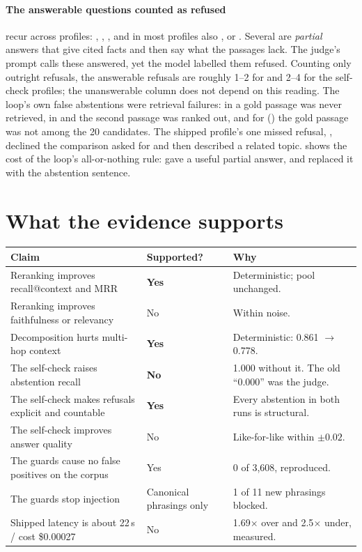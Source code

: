 \paragraph{The answerable questions counted as refused} recur across profiles: , , , and in most profiles also ,  or . Several are \emph{partial} answers that give cited facts and then say what the passages lack. The judge's prompt calls these answered, yet the model labelled them refused. \tagI{} Counting only outright refusals, the answerable refusals are roughly 1--2 for  and 2--4 for the self-check profiles; the unanswerable column does not depend on this reading. The loop's own false abstentions were retrieval failures: in  a gold passage was never retrieved, in  and  the second passage was ranked out, and for  () the gold passage was not among the 20 candidates. The shipped profile's one missed refusal, , declined the comparison asked for and then described a related topic.  shows the cost of the loop's all-or-nothing rule:  gave a useful partial answer, and  replaced it with the abstention sentence.

\section{What the evidence supports}

\begin{center}\small
\begin{tabularx}{\textwidth}{@{}>{\raggedright\arraybackslash}p{6.4cm}>{\raggedright\arraybackslash}p{2.0cm}L@{}}
\toprule
\textbf{Claim} & \textbf{Supported?} & \textbf{Why}\\
\midrule
Reranking improves recall@context and MRR & \textbf{Yes} & Deterministic; pool unchanged.\\
Reranking improves faithfulness or relevancy & No & Within noise.\\
Decomposition hurts multi-hop context & \textbf{Yes} & Deterministic: 0.861 $\rightarrow$ 0.778.\\
The self-check raises abstention recall & \textbf{No} & 1.000 without it. The old ``0.000'' was the judge.\\
The self-check makes refusals explicit and countable & \textbf{Yes} & Every abstention in both runs is structural.\\
The self-check improves answer quality & No & Like-for-like within $\pm0.02$.\\
The guards cause no false positives on the corpus & Yes & 0 of 3,608, reproduced.\\
The guards stop injection & Canonical phrasings only & 1 of 11 new phrasings blocked.\\
Shipped latency is about 22\,s / cost \$0.00027 & No & 1.69$\times$ over and 2.5$\times$ under, measured.\\
\bottomrule
\end{tabularx}
\end{center}

